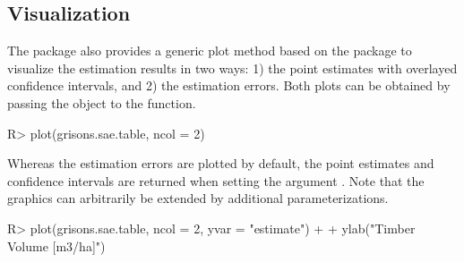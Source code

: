 \documentclass[article]{jss}
\begin{document}
\subsection{Visualization}

The  package also provides a  generic plot method based on the  package \citep{ggplot2} to visualize the estimation results in two ways: 1) the point estimates with overlayed confidence intervals, and 2) the estimation errors. Both plots can be obtained by passing the  object to the  function.


\begin{Schunk}
\begin{Sinput}
R> plot(grisons.sae.table, ncol = 2)
\end{Sinput}
\end{Schunk}


\begin{figure}[h]
\centering
{}
\end{figure}

\newpage

Whereas the estimation errors are plotted by default, the point estimates and confidence intervals are returned when setting the argument . Note that the graphics can arbitrarily be extended by additional  parameterizations.


\begin{Schunk}
\begin{Sinput}
R> plot(grisons.sae.table, ncol = 2, yvar = "estimate") +
+    ylab("Timber Volume [m3/ha]")
\end{Sinput}
\end{Schunk}
\end{document}
